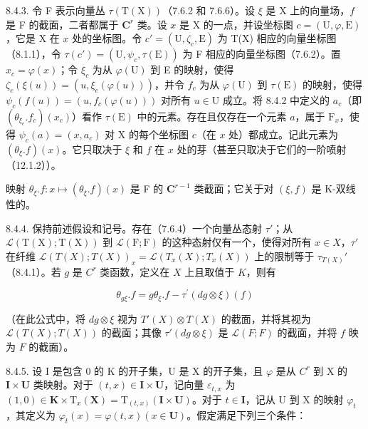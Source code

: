 8.4.3. 令 F 表示向量丛 \(\tau(\mathrm{T}(\mathrm{X}))\)（7.6.2 和 7.6.6）。设 \(\xi\) 是 X 上的向量场，\(f\) 是 F 的截面，二者都属于 \(\mathbf{C}^r\) 类。设 \(x\) 是 X 的一点，并设坐标图 \(c = (\mathrm{U}, \varphi, \mathrm{E})\)，它是 X 在 \(x\) 处的坐标图。令 \(c' = (\mathrm{U}, \zeta_c, \mathrm{E})\) 为 T(X) 相应的向量坐标图（8.1.1），令 \(\tau(c') = (\mathrm{U}, \psi_c, \tau(\mathrm{E}))\) 为 F 相应的向量坐标图（7.6.2）。置 \(x_c = \varphi(x)\)；令 \(\xi_c\) 为从 \(\varphi(\mathrm{U})\) 到 E 的映射，使得 \(\zeta_c(\xi(u)) = (u, \xi_c(\varphi(u)))\)，并令 \(f_c\) 为从 \(\varphi(\mathrm{U})\) 到 \(\tau(\mathrm{E})\) 的映射，使得 \(\psi_c(f(u)) = (u, f_c(\varphi(u)))\) 对所有 \(u \in \mathrm{U}\) 成立。将 8.4.2 中定义的 \(a_c\)（即 \((\theta_{\xi_c}.f_c)(x_c)\)）看作 \(\tau(\mathrm{E})\) 中的元素。存在且仅存在一个元素 \(a\)，属于 \(\mathrm{F}_x\)，使得 \(\psi_c(a) = (x, a_c)\) 对 X 的每个坐标图 \(c\)（在 \(x\) 处）都成立。记此元素为 \((\theta_\xi.f)(x)\)。它只取决于 \(\xi\) 和 \(f\) 在 \(x\) 处的芽（甚至只取决于它们的一阶喷射（12.1.2））。

映射 \(\theta_{\xi}.f: x \mapsto (\theta_{\xi}.f)(x)\) 是 F 的 \(\mathbf{C}^{r-1}\) 类截面；它关于对 \((\xi, f)\) 是 K-双线性的。

8.4.4. 保持前述假设和记号。存在（7.6.4）一个向量丛态射 \(\tau'\)；从 \(\mathcal{L}(\mathrm{T}(\mathrm{X});\mathrm{T}(\mathrm{X}))\) 到 \(\mathcal{L}(\mathrm{F};\mathrm{F})\) 的这种态射仅有一个，使得对所有 \(x \in X\)，\(\tau'\) 在纤维 \(\mathcal{L}(T(X); T(X))_x = \mathcal{L}(T_x(X); T_x(X))\) 上的限制等于 \(\tau_{T(X)}'\)（8.4.1）。若 \(g\) 是 \(C^r\) 类函数，定义在 \(X\) 上且取值于 \(K\)，则有

\[
\theta_ {g \xi}. f = g \theta_ {\xi}. f - \tau^ {\prime} (d g \otimes \xi) (f)
\]

（在此公式中，将 \(dg \otimes \xi\) 视为 \(T'(X) \otimes T(X)\) 的截面，并将其视为 \(\mathcal{L}(T(X); T(X))\) 的截面；其像 \(\tau'(dg \otimes \xi)\) 是 \(\mathcal{L}(F; F)\) 的截面，并将 \(f\) 映为 \(F\) 的截面）。

8.4.5. 设 I 是包含 0 的 K 的开子集，U 是 X 的开子集，且 \(\varphi\) 是从 \(C^r\) 到 X 的 \(\mathbf{I} \times \mathbf{U}\) 类映射。对于 \((t, x) \in \mathbf{I} \times \mathbf{U}\)，记向量 \(\varepsilon_{t,x}\) 为 \((1, 0) \in \mathbf{K} \times \mathrm{T}_x(\mathbf{X}) = \mathrm{T}_{(t,x)}(\mathbf{I} \times \mathbf{U})\)。对于 \(t \in \mathbf{I}\)，记从 U 到 X 的映射 \(\varphi_t\)，其定义为 \(\varphi_t(x) = \varphi(t, x) (x \in \mathbf{U})\)。假定满足下列三个条件：

